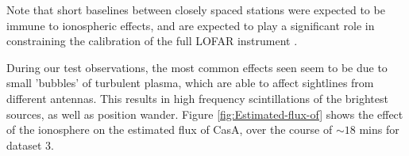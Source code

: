 \documentclass{aa}
\begin{document}
Note that  short baselines between closely  spaced stations were  expected to be
immune to  ionospheric effects, and are  expected to play a  significant role in
constraining    the     calibration    of    the     full    LOFAR    instrument
\citep{vdTol2007selfcallofar}.

During our  test observations, the  most common effects  seen seem to be  due to
small 'bubbles'  of turbulent plasma, which  are able to  affect sightlines from
different  antennas.  This  results  in  high frequency  scintillations  of  the
brightest     sources,     as    well     as     position    wander.      Figure
\ref{fig:Estimated-flux-of} shows the effect  of the ionosphere on the estimated
flux of CasA, over the course of $\sim18$ mins for dataset 3.

\begin{figure}[tbh]
\end{figure}
\end{document}
